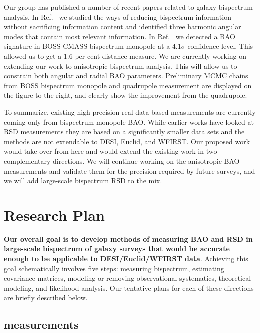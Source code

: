 Our group has published a number of recent papers related to galaxy bispectrum
analysis. In Ref.~\cite{2017MNRAS.467..928G} we studied the ways of reducing
bispectrum information without sacrificing information content and identified
three harmonic angular modes that contain most relevant information. In
Ref.~\cite{2018MNRAS.478.4500P} we detected a BAO signature in BOSS CMASS
bispectrum monopole at a 4.1$\sigma$ confidence level. This allowed us to
get a 1.6 per cent distance measure. We are currently working on extending our
work to anisotropic bispectrum analysis. This will allow us to constrain both
angular and radial BAO parameters. Preliminary MCMC chains from BOSS bispectrum
monopole and quadrupole measurement are displayed on the figure to the right,
and clearly show the improvement from the quadrupole.

To summarize, existing high precision real-data based measurements are
currently coming only from bispectrum monopole BAO. While earlier works have
looked at RSD measurements they are based on a significantly smaller data sets
and the methods are not extendable to DESI, Euclid, and WFIRST. Our proposed work
would take over from here and would extend the existing work in two
complementary directions. We will continue working on the anisotropic BAO
measurements and validate them for the precision required by future surveys,
and we will add large-scale bispectrum RSD to the mix.

\section{Research Plan}

\textbf{Our overall goal is to develop methods of measuring BAO and RSD in
large-scale bispectrum of galaxy surveys that would be accurate enough to be
applicable to DESI/Euclid/WFIRST data}. Achieving this goal schematically
involves five steps: measuring bispectrum, estimating covariance matrices,
modeling or removing observational systematics, theoretical modeling, and
likelihood analysis. Our tentative plans for each of these directions are
briefly described below.

\subsection*{measurements}

